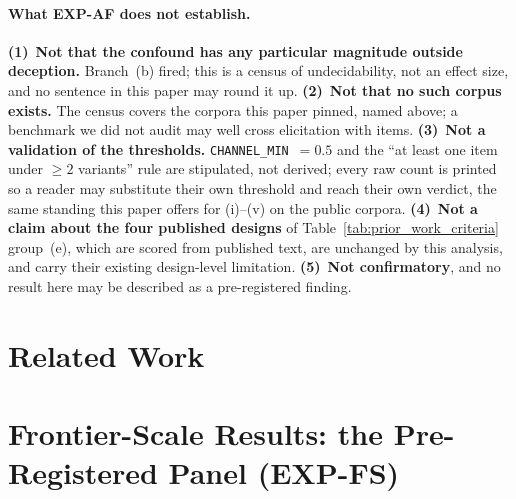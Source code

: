 \paragraph{What EXP-AF does not establish.} \textbf{(1)}~\textbf{Not that the confound has any particular magnitude outside deception.} Branch~(b) fired; this is a census of undecidability, not an effect size, and no sentence in this paper may round it up. \textbf{(2)}~\textbf{Not that no such corpus exists.} The census covers the corpora this paper pinned, named above; a benchmark we did not audit may well cross elicitation with items. \textbf{(3)}~\textbf{Not a validation of the thresholds.} \texttt{CHANNEL\_MIN}~$=0.5$ and the ``at least one item under $\geq\!2$ variants'' rule are stipulated, not derived; every raw count is printed so a reader may substitute their own threshold and reach their own verdict, the same standing this paper offers for (i)--(v) on the public corpora. \textbf{(4)}~\textbf{Not a claim about the four published designs} of Table~\ref{tab:prior_work_criteria} group~(e), which are scored from published text, are unchanged by this analysis, and carry their existing design-level limitation. \textbf{(5)}~\textbf{Not confirmatory}, and no result here may be described as a pre-registered finding.

\section{Related Work}
\label{app:related_work}


\section{Frontier-Scale Results: the Pre-Registered Panel (EXP-FS)}
\label{app:frontier_panel}

